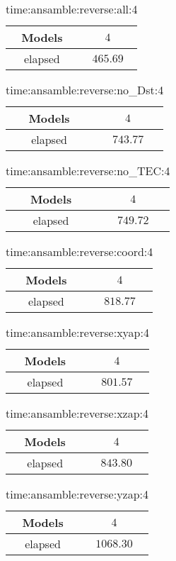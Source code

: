 \begin{table}[!ht]
	\centering
	\begin{tabular}{|c|c|}
		\hline
		Models & $4$ \\ \hline
		elapsed & $465.69$ \\ \hline
	\end{tabular}
	\caption{time:ansamble:reverse:all:4}
	\label{tab:time:ansamble:reverse:all:4}
\end{table}

\begin{table}[!ht]
	\centering
	\begin{tabular}{|c|c|}
		\hline
		Models & $4$ \\ \hline
		elapsed & $743.77$ \\ \hline
	\end{tabular}
	\caption{time:ansamble:reverse:no_Dst:4}
	\label{tab:time:ansamble:reverse:no_Dst:4}
\end{table}

\begin{table}[!ht]
	\centering
	\begin{tabular}{|c|c|}
		\hline
		Models & $4$ \\ \hline
		elapsed & $749.72$ \\ \hline
	\end{tabular}
	\caption{time:ansamble:reverse:no_TEC:4}
	\label{tab:time:ansamble:reverse:no_TEC:4}
\end{table}

\begin{table}[!ht]
	\centering
	\begin{tabular}{|c|c|}
		\hline
		Models & $4$ \\ \hline
		elapsed & $818.77$ \\ \hline
	\end{tabular}
	\caption{time:ansamble:reverse:coord:4}
	\label{tab:time:ansamble:reverse:coord:4}
\end{table}

\begin{table}[!ht]
	\centering
	\begin{tabular}{|c|c|}
		\hline
		Models & $4$ \\ \hline
		elapsed & $801.57$ \\ \hline
	\end{tabular}
	\caption{time:ansamble:reverse:xyap:4}
	\label{tab:time:ansamble:reverse:xyap:4}
\end{table}

\begin{table}[!ht]
	\centering
	\begin{tabular}{|c|c|}
		\hline
		Models & $4$ \\ \hline
		elapsed & $843.80$ \\ \hline
	\end{tabular}
	\caption{time:ansamble:reverse:xzap:4}
	\label{tab:time:ansamble:reverse:xzap:4}
\end{table}

\begin{table}[!ht]
	\centering
	\begin{tabular}{|c|c|}
		\hline
		Models & $4$ \\ \hline
		elapsed & $1068.30$ \\ \hline
	\end{tabular}
	\caption{time:ansamble:reverse:yzap:4}
	\label{tab:time:ansamble:reverse:yzap:4}
\end{table}
